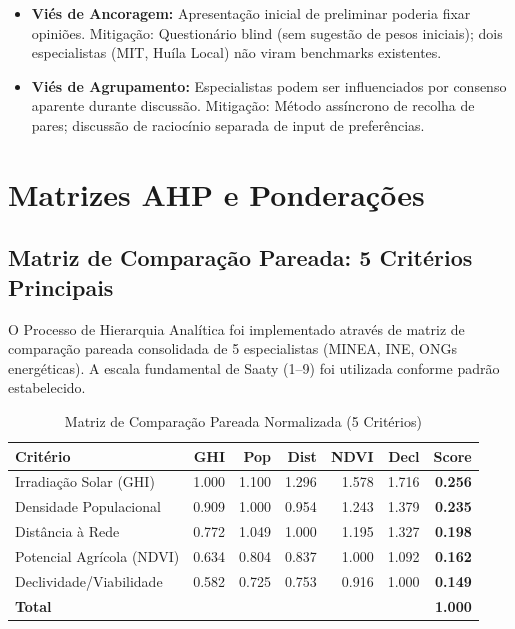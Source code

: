 \documentclass[12pt, a4paper]{article}
\begin{document}
{{{{{{{{{{{{\begin{itemize}
\item \textbf{Viés de Ancoragem:} Apresentação inicial de preliminar poderia fixar opiniões. Mitigação: Questionário blind (sem sugestão de pesos iniciais); dois especialistas (MIT, Huíla Local) não viram benchmarks existentes.

\item \textbf{Viés de Agrupamento:} Especialistas podem ser influenciados por consenso aparente durante discussão. Mitigação: Método assíncrono de recolha de pares; discussão de raciocínio separada de input de preferências.
\end{itemize}

\section{Matrizes AHP e Ponderações}
\label{app:ahp_matrix}

\subsection{Matriz de Comparação Pareada: 5 Critérios Principais}

O Processo de Hierarquia Analítica foi implementado através de matriz de comparação pareada consolidada de 5 especialistas (MINEA, INE, ONGs energéticas). A escala fundamental de Saaty (1–9) foi utilizada conforme padrão estabelecido.

\begin{table}[H]
\centering
\caption{Matriz de Comparação Pareada Normalizada (5 Critérios)}
\label{tab:ahp_matrix_detailed}
\footnotesize
\begin{tabular}{|l|r|r|r|r|r|r|}
\hline
\textbf{Critério} & \textbf{GHI} & \textbf{Pop} & \textbf{Dist} & \textbf{NDVI} & \textbf{Decl} & \textbf{Score} \\
\hline
Irradiação Solar (GHI) & 1.000 & 1.100 & 1.296 & 1.578 & 1.716 & \textbf{0.256} \\
Densidade Populacional & 0.909 & 1.000 & 0.954 & 1.243 & 1.379 & \textbf{0.235} \\
Distância à Rede & 0.772 & 1.049 & 1.000 & 1.195 & 1.327 & \textbf{0.198} \\
Potencial Agrícola (NDVI) & 0.634 & 0.804 & 0.837 & 1.000 & 1.092 & \textbf{0.162} \\
Declividade/Viabilidade & 0.582 & 0.725 & 0.753 & 0.916 & 1.000 & \textbf{0.149} \\
\hline
\textbf{Total} & & & & & & \textbf{1.000} \\
\hline
\end{tabular}
\end{table}

}}}}}}}}}}}}
\end{document}
